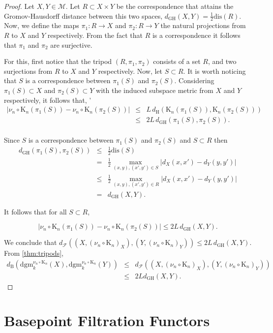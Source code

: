 \documentclass[a4paper,12pt,reqno, english]{amsart}
\newcommand{\dgh}{d_{\mathrm{GH}}}
\newcommand{\dB}{d_{\mathrm{B}}}
\newcommand{\dH}{d_{\mathrm{H}}}
\newcommand{\cset}{\mathrm{K}}
\newcommand{\dgm}{\mathrm{dgm}}
\newcommand{\dis}{\mathrm{dis}}
\newcommand{\M}{\mathcal{M}}
\newcommand{\F}{\mathcal{F}}
\theoremstyle{plain}
\theoremstyle{definition}
\begin{document}
\begin{proof}
Let $X,Y\in \M$. Let $R\subset X\times Y$ be the correspondence that attains the Gromov-Hausdorff distance between this two spaces, $\dgh(X,Y)=\frac{1}{2}\dis(R)$. Now, we define the maps $\pi_1:R\rightarrow X$ and $\pi_2: R\rightarrow Y$ the natural projections from $R$ to $X$ and $Y$ respectively. From the fact that $R$ is a correspondence it follows that $\pi_1$ and $\pi_2$  are surjective. 

For this, first notice that the tripod $(R,\pi_1,\pi_2)$ consists of a set $R$, and two surjections from $R$ to $X$ and $Y$ respectively. Now, let $S\subset R$. It is worth noticing that $S$ is a correspondence between $\pi_1(S)$ and $\pi_2(S)$. Considering $\pi_1(S)\subset X$ and $\pi_2(S)\subset Y$ with the induced subspace metric from $X$ and $Y$ respectively, it follows that,
'
\begin{eqnarray*}
|\nu_n\circ \cset_n(\pi_1(S))-\nu_n\circ \cset_n(\pi_2(S))|&\leq & L \,\dH(\cset_n(\pi_1(S)), \cset_n(\pi_2(S)))\\
  &\leq& 2L\,\dgh(\pi_1(S),\pi_2(S)).\\  
\end{eqnarray*}

Since $S$ is a correspondence between $\pi_1(S)$ and $\pi_2(S)$ and $S\subset R$ then
\begin{eqnarray*}
\dgh(\pi_1(S),\pi_2(S))&\leq &\frac{1}{2} \dis(S)\\
	&=& \frac{1}{2}\max_{(x,y),(x',y')\in S} |d_X(x,x')-d_Y(y,y')|\\
	&\leq& \frac{1}{2}\max_{(x,y),(x',y')\in R} |d_X(x,x')-d_Y(y,y')|\\
    &=& \dgh(X,Y).
\end{eqnarray*}

It follows that for all $S\subset R$, 

$$ |\nu_n\circ \cset_n(\pi_1(S))-\nu_n\circ \cset_n(\pi_2(S))|\leq 2L\, \dgh(X,Y).$$

We conclude that $d_{\F}((X,(\nu_n\circ \cset_n)_X),(Y,(\nu_n\circ \cset_n)_Y))\leq 2L\,\dgh(X,Y).$ From  \ref{thm:tripods},  
\begin{eqnarray*}
\dB(\dgm^{\nu_n\circ\cset_n}_k(X), \dgm^{\nu_n\circ\cset_n}_k(Y))&\leq & d_{\F }((X,(\nu_n\circ \cset_n)_X),(Y,(\nu_n\circ \cset_n)_Y))\\
&\leq & 2L\dgh(X,Y).
\end{eqnarray*}
\end{proof}


\section{Basepoint Filtration Functors}
\end{document}
